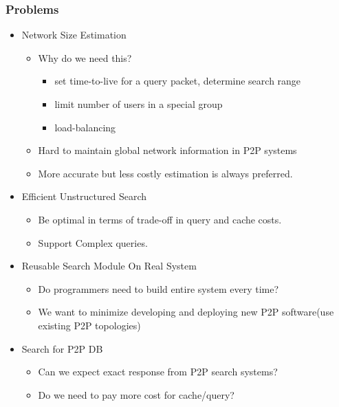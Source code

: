 \documentclass[red]{beamer}
\begin{document}
\begin{frame}
\frametitle{Problems}
\begin{itemize}
\item<1> Network Size Estimation
\begin{itemize}
\item Why do we need this?
\begin{itemize}
\item set time-to-live for a query packet, determine search range
\item limit number of users in a special group
\item load-balancing
\end{itemize}
\item Hard to maintain global network information in P2P systems
\item More accurate but less costly estimation is always preferred. 
\end{itemize}
\item<2> Efficient Unstructured Search
\begin{itemize}
\item Be optimal in terms of trade-off in query and cache costs.
\item Support Complex queries.
\end{itemize}
\item<3> Reusable Search Module On Real System
\begin{itemize}
\item Do programmers need to build entire system every time?
\item We want to minimize developing and deploying new P2P software(use existing P2P topologies)
\end{itemize}
\item<4-> Search for P2P DB
\begin{itemize}
\item Can we expect exact response from P2P search systems?
\item Do we need to pay more cost for cache/query?
\end{itemize}
\end{itemize}
\end{frame}
\end{document}
